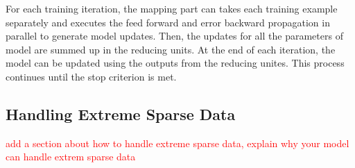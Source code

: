 For each training iteration, the mapping part can takes each training
example separately and executes the feed forward and error backward
propagation in parallel to generate model updates. Then, the updates
for all the parameters of {\sppan} model are summed up in the reducing
units. At the end of each iteration, the {\sppan} model can be updated
using the outputs from the reducing unites. This process continues
until the stop criterion is met.


\subsection{Handling Extreme Sparse Data}

\textcolor{red}{add a section about how to handle extreme sparse data,
  explain why your model can handle extrem sparse data}

